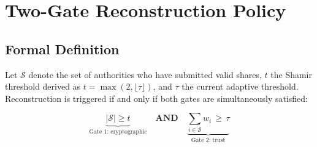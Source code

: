 \documentclass[12pt,a4paper]{article}
\theoremstyle{definition}
\theoremstyle{remark}
\begin{document}
\section{Two-Gate Reconstruction Policy}
\label{sec:twogates}

\subsection{Formal Definition}

Let $\mathcal{S}$ denote the set of authorities who have submitted
valid shares, $t$ the Shamir threshold derived as
$t = \max(2, \lfloor\tau\rfloor)$, and $\tau$ the current adaptive threshold.
Reconstruction is triggered if and only if both gates are simultaneously
satisfied:

\begin{equation}
  \underbrace{|\mathcal{S}| \geq t}_{\text{Gate 1: cryptographic}}
  \quad \textbf{AND} \quad
  \underbrace{\displaystyle\sum_{i \in \mathcal{S}} w_i \,\geq\, \tau}_{\text{Gate 2: trust}}
  \label{eq:twogates}
\end{equation}
\end{document}
